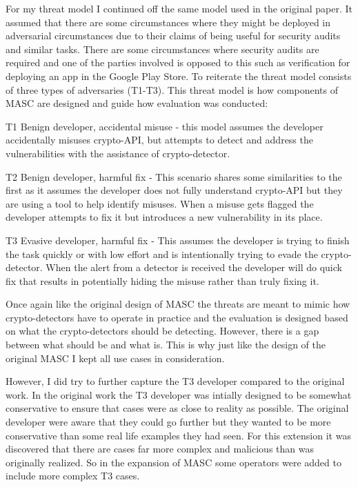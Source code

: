 For my threat model I continued off the same model used in the original paper. It assumed that there are some circumstances where they might be deployed in adversarial circumstances due to their claims of being useful for security audits and similar tasks. There are some circumstances where security audits are required and one of the parties involved is opposed to this such as verification for deploying an app in the Google Play Store. To reiterate the threat model consists of three types of adversaries (T1-T3). This threat model is how components of MASC are designed and guide how evaluation was conducted:

T1 Benign developer, accidental misuse - this model assumes the developer accidentally misuses crypto-API, but attempts to detect and address the vulnerabilities with the assistance of crypto-detector.

T2 Benign developer, harmful fix - This scenario shares some similarities to the first as it assumes the developer does not fully understand crypto-API but they are using a tool to help identify misuses. When a misuse gets flagged the developer attempts to fix it but introduces a new vulnerability in its place.

T3 Evasive developer, harmful fix - This assumes the developer is trying to finish the task quickly or with low effort and is intentionally trying to evade the crypto-detector. When the alert from a detector is received the developer will do quick fix that results in potentially hiding the misuse rather than truly fixing it.

Once again like the original design of MASC the threats are meant to mimic how crypto-detectors have to operate in practice and the evaluation is designed based on what the crypto-detectors should be detecting. However, there is a gap between what should be and what is. This is why just like the design of the original MASC I kept all use cases in consideration. 

However, I did try to further capture the T3 developer compared to the original work. In the original work the T3 developer was intially designed to be somewhat conservative to ensure that cases were as close to reality as possible. The original developer were aware that they could go further but they wanted to be more conservative than some real life examples they had seen. For this extension it was discovered that there are cases far more complex and malicious than was originally realized. So in the expansion of MASC some operators were added to include more complex T3 cases.


